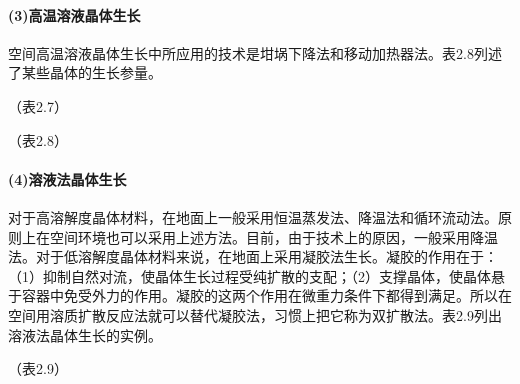 \paragraph{(3)高温溶液晶体生长}空间高温溶液晶体生长中所应用的技术是坩埚下降法和移动加热器法。表2.8列述了某些晶体的生长参量。

（表2.7）

（表2.8）

\paragraph{(4)溶液法晶体生长}对于高溶解度晶体材料，在地面上一般采用恒温蒸发法、降温法和循环流动法。原则上在空间环境也可以采用上述方法。目前，由于技术上的原因，一般采用降温法。对于低溶解度晶体材料来说，在地面上采用凝胶法生长。凝胶的作用在于：（1）抑制自然对流，使晶体生长过程受纯扩散的支配；（2）支撑晶体，使晶体悬于容器中免受外力的作用。凝胶的这两个作用在微重力条件下都得到满足。所以在空间用溶质扩散反应法就可以替代凝胶法，习惯上把它称为双扩散法。表2.9列出溶液法晶体生长的实例。

（表2.9）

